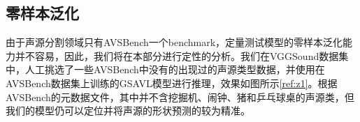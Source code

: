 \documentclass[12pt]{article}
\begin{document}
\subsection{零样本泛化}
由于声源分割领域只有AVSBench一个benchmark，定量测试模型的零样本泛化能力并不容易，因此，我们将在本部分进行定性的分析。我们在VGGSound数据集中，人工挑选了一些AVSBench中没有的出现过的声源类型数据，并使用在AVSBench数据集上训练的GSAVL模型进行推理，效果如图所示\ref{ref:z1}。根据AVSBench的元数据文件，其中并不含挖掘机、闹钟、猪和乒乓球桌的声源类，但我们的模型仍可以定位并将声源的形状预测的较为精准。
\begin{figure}[!h]
  \centering
\end{figure}
\end{document}
